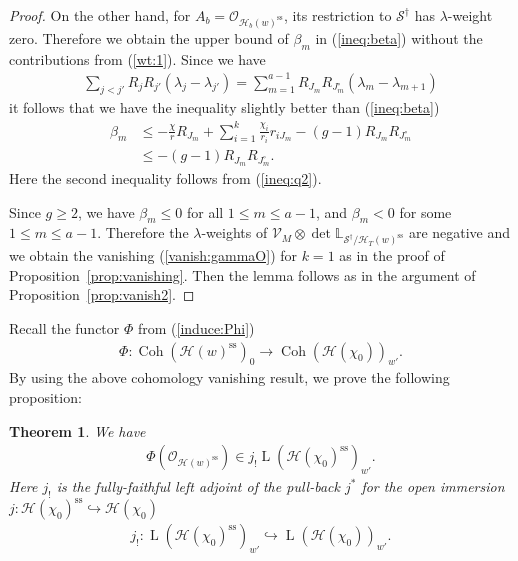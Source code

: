 \documentclass[11pt,oneside,a4paper,mathscr]{amsart}
\newtheorem{thm}{Theorem}[section]
\theoremstyle{definition}
\renewcommand{\leq}{\leqslant}
\renewcommand{\geq}{\geqslant}
\newcommand{\cS}{\mathcal{S}}
\newcommand{\LL}{\operatorname{L}}
\newcommand{\cH}{\mathcal{H}}
\newcommand{\Coh}{\operatorname{Coh}}
\begin{document}
\begin{proof}
   On the other hand, for $A_b=\mathcal{O}_{\cH_b(w)^{\mathrm{ss}}}$, 
   its restriction to $\cS^{\dag}$ has $\lambda$-weight zero. 
   Therefore we obtain the upper bound of $\beta_m$ in (\ref{ineq:beta})
   without the contributions from (\ref{wt:1}). 
   Since we have 
   \begin{align*}
       \sum_{j<j'}R_j R_{j'}(\lambda_j-\lambda_{j'})=\sum_{m=1}^{a-1}R_{J_m}R_{J_m^{\circ}}(\lambda_m-\lambda_{m+1})
   \end{align*}
   it follows that we have the inequality slightly better than (\ref{ineq:beta})
   \begin{align*}
   \beta_m &\leq 
    -\frac{\chi}{r}R_{J_m}+\sum_{i=1}^k \frac{\chi_i}{r_i}r_{iJ_m}
    -(g-1)R_{J_m}R_{J_m^{\circ}} \\&\leq -(g-1)R_{J_m}R_{J_m^{\circ}}.
    \end{align*}
    Here the second inequality follows from (\ref{ineq:q2}). 
    
    Since $g\geq 2$, we have $\beta_m\leq 0$ for all $1\leq m \leq a-1$, 
    and $\beta_m<0$ for some $1\leq m\leq a-1$.
    Therefore the $\lambda$-weights of $\mathcal{V}_M \otimes \det \mathbb{L}_{\cS^{\dag}/\cH_T(w)^{\mathrm{ss}}}$ are negative 
    and we obtain the vanishing (\ref{vanish:gammaO}) for $k=1$ as in the proof of Proposition~\ref{prop:vanishing}. Then the lemma follows as in 
    the argument of Proposition~\ref{prop:vanish2}. 
\end{proof}
Recall the functor $\Phi$ from (\ref{induce:Phi})
\begin{align*}
    \Phi \colon \Coh(\cH(w)^{\mathrm{ss}})_0 \to \Coh(\cH(\chi_0))_{w'}.
\end{align*}
By using the above cohomology vanishing result, we prove the following proposition: 
\begin{thm}\label{thm:PhiO}
We have 
\begin{align*}
\Phi(\mathcal{O}_{\cH(w)^{\mathrm{ss}}})\in j_{!}\LL(\cH(\chi_0)^{\mathrm{ss}})_{w'}.
\end{align*}   
Here $j_{!}$ is the fully-faithful left adjoint of the pull-back $j^*$
for the open immersion $j \colon \cH(\chi_0)^{\mathrm{ss}} \hookrightarrow \cH(\chi_0)$
\begin{align*}j_{!} \colon \LL(\cH(\chi_0)^{\mathrm{ss}})_{w'} \hookrightarrow \LL(\cH(\chi_0))_{w'}.
\end{align*}
\end{thm}
\end{document}
